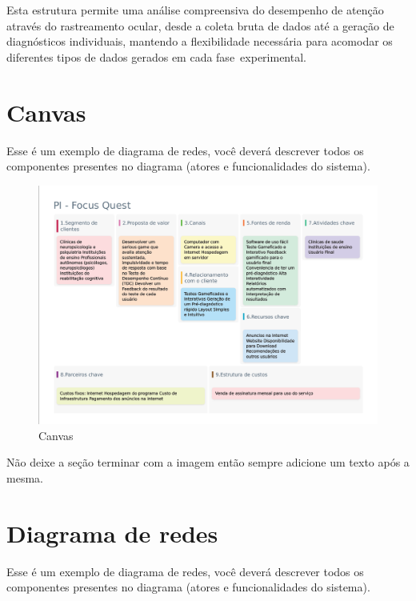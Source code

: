 \documentclass[
  a4paper,%
  12pt,%
  english,%
  brazilian,%
]{article}
\begin{document}
 Esta estrutura permite uma análise compreensiva do desempenho de atenção através do rastreamento ocular, desde a coleta bruta de dados até a geração de diagnósticos individuais, mantendo a flexibilidade necessária para acomodar os diferentes tipos de dados gerados em cada fase experimental.

\section*{Canvas}
    
    Esse é um exemplo de diagrama de redes, você deverá descrever todos os componentes presentes no diagrama (atores e funcionalidades do sistema).

\begin{figure}[H]
\centering
\caption{Canvas}%
\label{fig:canvas}
\includegraphics[width=1.1\textwidth]{Logos/canvas.png}
\end{figure}

    Não deixe a seção terminar com a imagem então sempre adicione um texto após a mesma.

\section*{Diagrama de redes}
    
    Esse é um exemplo de diagrama de redes, você deverá descrever todos os componentes presentes no diagrama (atores e funcionalidades do sistema).
\end{document}
